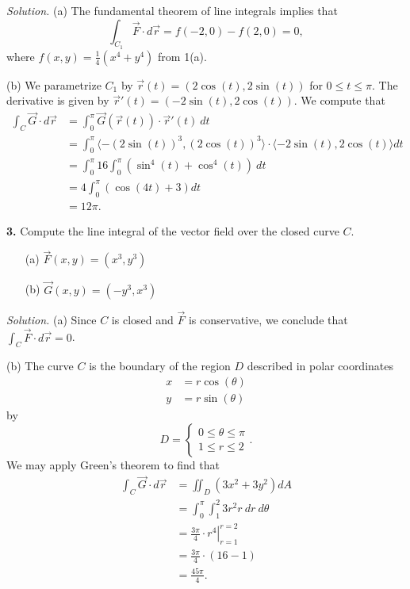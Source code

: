 \documentclass{article}
\begin{document}
\medskip

{\color{blue}
\noindent \emph{Solution.} (a) The fundamental theorem of line integrals implies that 
\[
\int_{C_1} \vec{F} \cdot d\vec{r} =  f(-2,0) - f(2,0) = 0,
\]
where $f(x,y) = \frac{1}{4}(x^4 + y^4)$ from 1(a). 

(b) We parametrize $C_1$ by $\vec{r}(t) = (2\cos(t), 2\sin(t))$ for $0 \leqslant t \leqslant \pi$. The derivative is given by $\vec{r}'(t) = (-2\sin(t), 2\cos(t))$. We compute that 
\begin{align*}
\int_C \vec{G} \cdot d\vec{r} &= \int_0^{\pi} \vec{G}(\vec{r}(t)) \cdot \vec{r}'(t) \:dt \\
&= \int_0^\pi \langle -(2\sin(t))^3, (2\cos(t))^3 \rangle \cdot \langle -2\sin(t), 2 \cos(t) \rangle dt \\
&= \int_0^\pi 16 \int_0^\pi (\sin^4(t) + \cos^4(t)) \: dt \\
&= 4 \int_0^\pi (\cos(4t) + 3) dt \\
&= 12 \pi. 
\end{align*}
}

\vspace{3mm}

\noindent \textbf{3.} Compute the line integral of the vector field over the closed curve $C$. 
\begin{enumerate}
\item[(a)] $\vec{F}(x,y) = (x^3, y^3)$
\item[(b)] $\vec{G}(x,y) = (-y^3, x^3)$
\end{enumerate}


\medskip

{\color{blue}
\noindent \emph{Solution.} (a) Since $C$ is closed and $\vec{F}$ is conservative, we conclude that $\int_C \vec{F} \cdot d\vec{r} = 0$. 

(b) The curve $C$ is the boundary of the region $D$ described in polar coordinates 
\begin{align*}
x &= r \cos(\theta) \\
y &= r \sin(\theta)
\end{align*}
by 
\[
D = \begin{cases}
0 \leqslant \theta \leqslant \pi \\
1 \leqslant r \leqslant 2
\end{cases}.
\]
We may apply Green's theorem to find that 
\begin{align*}
\int_C \vec{G} \cdot d\vec{r} &= \iint_D (3x^2 + 3y^2) dA \\
&= \int_0^\pi \int_1^2 3r^2 r \: dr \: d\theta \\
&= \frac{3\pi}{4} \cdot \left.r^4\right|_{r=1}^{r=2} \\
&= \frac{3\pi}{4} \cdot (16-1) \\
&= \frac{45\pi}{4}.
\end{align*}
}
\end{document}
